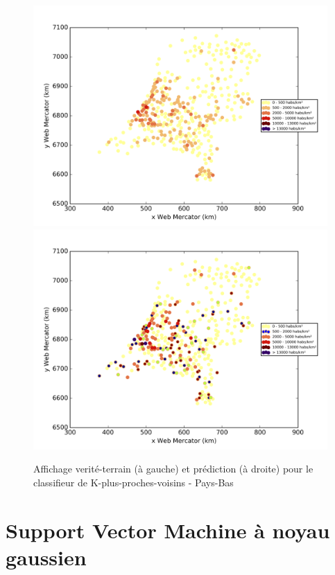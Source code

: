 \documentclass{book}
\begin{document}
\begin{figure}[H]
\centerline{
\includegraphics[scale=0.5]{../../data/Pays-Bas/test/Nearest_Neighboors_Classification/Nearest_Neighboors_Classification/density_ground_truth.png}
\includegraphics[scale=0.5]{../../data/Pays-Bas/test/Nearest_Neighboors_Classification/Nearest_Neighboors_Classification/density_classification.png}
}
\caption{Affichage verité-terrain (à gauche) et prédiction (à droite) pour le classifieur de K-plus-proches-voisins - Pays-Bas}
\label{nn_carte_pays-bas}
\end{figure}


\section{Support Vector Machine à noyau gaussien}
\end{document}
